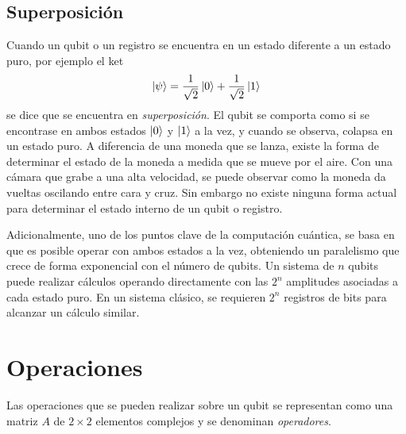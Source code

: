 \subsection{Superposición}

Cuando un qubit o un registro se encuentra en un estado diferente a un estado 
puro, por ejemplo el ket
$$\ket{\psi} = \frac{1}{\sqrt{2}} \ket{0} + \frac{1}{\sqrt{2}} \ket{1} $$
se dice que se encuentra en \textit{superposición}. El qubit se comporta como si 
se encontrase en ambos estados $\ket{0}$ y $\ket{1}$ a la vez, y cuando se 
observa, colapsa en un estado puro. A diferencia de una moneda que se lanza, 
existe la forma de determinar el estado de la moneda a medida que se mueve por 
el aire. Con una cámara que grabe a una alta velocidad, se puede observar como 
la moneda da vueltas oscilando entre cara y cruz. Sin embargo no existe ninguna 
forma actual para determinar el estado interno de un qubit o registro.

Adicionalmente, uno de los puntos clave de la computación cuántica, se basa en 
que es posible operar con ambos estados a la vez, obteniendo un paralelismo que 
crece de forma exponencial con el número de qubits. Un sistema de $n$ qubits 
puede realizar cálculos operando directamente con las $2^n$ amplitudes asociadas 
a cada estado puro. En un sistema clásico, se requieren $2^n$ registros de bits 
para alcanzar un cálculo similar.

\section{Operaciones}

Las operaciones que se pueden realizar sobre un qubit se representan como una 
matriz $A$ de $2 \times 2$ elementos complejos y se denominan 
\textit{operadores}.

